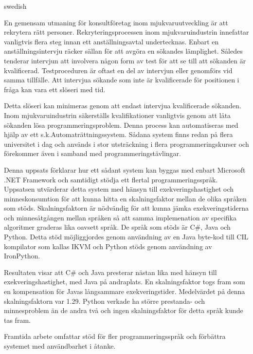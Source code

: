 \begin{foreignabstract}{swedish}

En gemensam utmaning för konsultföretag inom mjukvaruutveckling är att rekrytera rätt personer. Rekryteringsprocessen inom mjukvaruindustrin innefattar vanligtvis flera steg innan ett anställningsavtal undertecknas. Enbart en anställningsintervju räcker sällan för att avgöra en sökandes lämplighet. Således tenderar intervjun att involvera någon form av test för att se till att sökanden är kvalificerad. Testproceduren är oftast en del av intervjun eller genomförs vid samma tillfälle. Att intervjua sökande som inte är kvalificerade för positionen i fråga kan vara ett slöseri med tid.

Detta slöseri kan minimeras genom att endast intervjua kvalificerade sökanden. Inom mjukvaruindustrin säkerställs kvalifikationer vanligtvis genom att låta sökanden lösa programmeringsproblem. Denna process kan automatiseras med hjälp av ett s.k.Automaträttningssystem. Sådana system finns redan på flera universitet i dag och används i stor utsträckning i flera programmeringskurser och förekommer även i samband med programmeringstävlingar.

Denna uppsats förklarar hur ett sådant system kan byggas med enbart Microsoft .NET Framework och samtidigt stödja ett flertal programmeringsspråk. Uppsatsen utvärderar detta system med hänsyn till exekveringshastighet och minneskonsumtion för att kunna hitta en skalningsfaktor mellan de olika språken som stöds. Skalningsfaktorn är nödvändig för att kunna jämka exekveringstiderna och minnesåtgången mellan språken så att samma implemenation av specifika algoritmer graderas lika oavsett språk. De språk som stöds är C\#, Java och Python. Detta stöd möjliggjordes genom användning av en Java byte-kod till CIL kompilator som kallas IKVM och Python stöds genom användning av IronPython.

Resultaten visar att C\# och Java presterar nästan lika med hänsyn till exekveringshastighet, med Java på andraplats. En skalningsfaktor togs fram som en kompensation för Javas långsammare exekveringstider. Medelvärdet på denna skalningsfaktorn var 1.29. Python verkade ha större prestanda- och minnesproblem än de andra två och ingen skalningsfaktor för detta språk kunde tas fram.

Framtida arbete omfattar stöd för fler programmeringsspråk och förbättra systemet med användbarhet i åtanke.

\end{foreignabstract}
